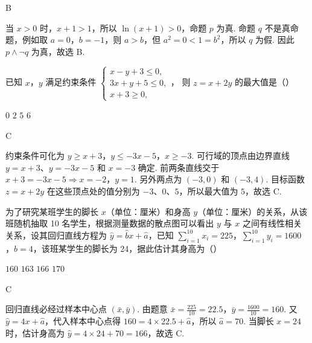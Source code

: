 \begin{answer}
B
\end{answer}

\begin{solution}
当 \(x>0\) 时，\(x+1>1\)，所以 \(\ln(x+1)>0\)，命题 \(p\) 为真. 命题 \(q\) 不是真命题，例如取 \(a=0\)，\(b=-1\)，则 \(a>b\)，但 \(a^2=0<1=b^2\)，所以 \(q\) 为假. 因此 \(p\land\lnot q\) 为真，故选 B.
\end{solution}

\begin{problem}
已知 \(x\)，\(y\) 满足约束条件
\(\begin{cases}
x-y+3\le 0,\\
3x+y+5\le 0,\\
x+3\ge 0,
\end{cases}\)，
则 \(z=x+2y\) 的最大值是（\quad）

\choices
    {\(0\)}
    {\(2\)}
    {\(5\)}
    {\(6\)}
\end{problem}

\begin{answer}
C
\end{answer}

\begin{solution}
约束条件可化为
\(y\geq x+3\)，\(y\leq-3x-5\)，\(x\geq-3\).
可行域的顶点由边界直线 \(y=x+3\)、\(y=-3x-5\) 和 \(x=-3\) 确定. 前两条直线交于
\(x+3=-3x-5\Longrightarrow x=-2\)，\(y=1\).
另外两点为 \((-3,0)\) 和 \((-3,4)\). 目标函数 \(z=x+2y\) 在这些顶点处的值分别为 \(-3\)、\(0\)、\(5\)，所以最大值为 \(5\)，故选 C.
\end{solution}

\begin{problem}
为了研究某班学生的脚长 \(x\)（单位：厘米）和身高 \(y\)（单位：厘米）的关系，从该班随机抽取 10 名学生，根据测量数据的散点图可以看出 \(y\) 与 \(x\) 之间有线性相关关系，设其回归直线方程为 \(\hat y=\hat b x+\hat a\)，已知 \(\sum_{i=1}^{10}x_i=225\)，\(\sum_{i=1}^{10}y_i=1600\)，\(\hat b=4\)，该班某学生的脚长为 24，据此估计其身高为（\quad）

\choices
    {\(160\)}
    {\(163\)}
    {\(166\)}
    {\(170\)}
\end{problem}

\begin{answer}
C
\end{answer}

\begin{solution}
回归直线必经过样本中心点 \((\bar x,\bar y)\). 由题意
\(\bar x=\frac{225}{10}=22.5\)，\(\bar y=\frac{1600}{10}=160\).
又 \(\hat y=4x+\hat a\)，代入样本中心点得 \(160=4\times22.5+\hat a\)，所以 \(\hat a=70\). 当脚长 \(x=24\) 时，估计身高为 \(\hat y=4\times24+70=166\)，故选 C.
\end{solution}

